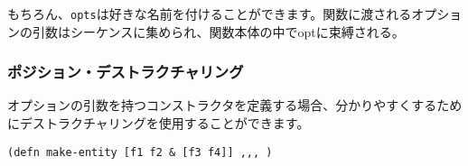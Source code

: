 もちろん、\texttt{opts}は好きな名前を付けることができます。関数に渡されるオプションの引数はシーケンスに集められ、関数本体の中でoptに束縛される。


\subsubsection{ポジション・デストラクチャリング}

オプションの引数を持つコンストラクタを定義する場合、分かりやすくするためにデストラクチャリングを使用することができます。

\begin{lstlisting}[numbers=none]
(defn make-entity [f1 f2 & [f3 f4]] ,,, )
\end{lstlisting}













